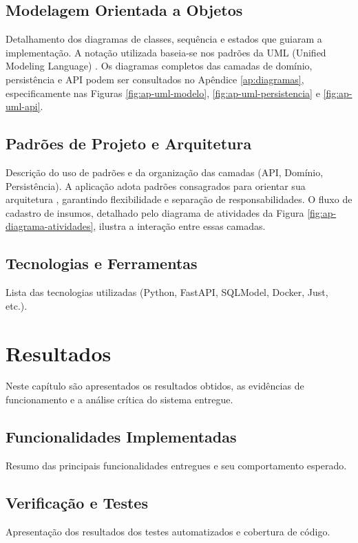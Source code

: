 \documentclass[conference]{IEEEtran}
\begin{document}
\subsection{Modelagem Orientada a Objetos}
\label{subsec:modelagem}
Detalhamento dos diagramas de classes, sequência e estados que
guiaram a implementação. A notação utilizada baseia-se nos padrões da
UML (Unified Modeling Language) \cite{b1}. Os diagramas completos das
camadas de domínio, persistência e API podem ser consultados no
Apêndice \ref{ap:diagramas}, especificamente nas Figuras
\ref{fig:ap-uml-modelo}, \ref{fig:ap-uml-persistencia} e \ref{fig:ap-uml-api}.

\subsection{Padrões de Projeto e Arquitetura}
\label{subsec:padroes}
Descrição do uso de padrões e da organização das camadas (API,
Domínio, Persistência). A aplicação adota padrões consagrados para
orientar sua arquitetura \cite{b2}, garantindo flexibilidade e
separação de responsabilidades. O fluxo de cadastro de insumos,
detalhado pelo diagrama de atividades da Figura
\ref{fig:ap-diagrama-atividades}, ilustra a interação entre essas camadas.

\subsection{Tecnologias e Ferramentas}
\label{subsec:tecnologias}
Lista das tecnologias utilizadas (Python, FastAPI, SQLModel, Docker,
Just, etc.).

\section{Resultados}
\label{sec:resultados}
Neste capítulo são apresentados os resultados obtidos, as evidências
de funcionamento e a análise crítica do sistema entregue.

\subsection{Funcionalidades Implementadas}
\label{subsec:funcionalidades}
Resumo das principais funcionalidades entregues e seu comportamento esperado.

\subsection{Verificação e Testes}
\label{subsec:testes}
Apresentação dos resultados dos testes automatizados e cobertura de código.
\end{document}
